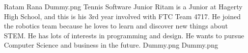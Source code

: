 \insertbio
{Ratam Rana}
{Dummy.png}
{Tennis}
{Software}
{Junior}
{
Ritam is a Junior at Hagerty High School, and this is his 3rd year involved with FTC Team 4717. He joined the robotics team because he loves to learn and discover new things about STEM. He has lots of interests in programming and design. He wants to pursue Computer Science and business in the future.
}
{Dummy.png}
{Dummy.png}
